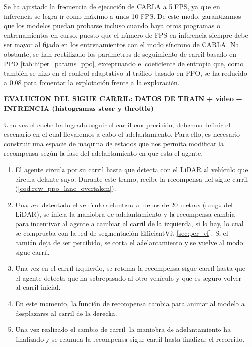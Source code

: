 Se ha ajustado la frecuencia de ejecución de CARLA a 5 \ac{FPS}, ya que en inferencia se logra ir como máximo a unos 10 \ac{FPS}. De este modo, garantizamos que los modelos puedan probarse incluso cuando haya otros programas o entrenamientos en curso, puesto que el número de \ac{FPS} en inferencia siempre debe ser mayor al fijado en los entrenamientos con el modo síncrono de CARLA. No obstante, se han reutilizado los parámetros de seguimiento de carril basado en \ac{PPO} \ref{tab:hiper_params_ppo}, exceptuando el coeficiente de entropía que, como también se hizo en el control adaptativo al tráfico basado en \ac{PPO}, se ha reducido a 0.08 para fomentar la explotación frente a la exploración.

\textbf{EVALUCION DEL SIGUE CARRIL: DATOS DE TRAIN + video + INFRENCIA (histogramas steer y throttle)}

Una vez el coche ha logrado seguir el carril con precisión, debemos definir el escenario en el cual llevaremos a cabo el adelantamiento. Para ello, es necesario construir una espacie de máquina de estados que nos permita modificar la recompensa según la fase del adelantamiento en que esta el agente.
\begin{enumerate}
\item El agente circula por su carril hasta que detecta con el \ac{LiDAR} al vehículo que circula delante suyo. Durante este tramo, recibe la recompensa del sigue-carril (\ref{cod:rew_ppo_lane_overtaken}).
\item Una vez detectado el vehículo delantero a menos de 20 metros (rango del \ac{LiDAR}), se inicia la maniobra de adelantamiento y la recompensa cambia para incentivar al agente a cambiar al carril de la izquierda, si lo hay, lo cual se comprueba con la red de segmentación EfficientVit \ref{sec:per_ef}. Si el camión deja de ser percibido, se corta el adelantamiento y se vuelve al modo sigue-carril.
\item Una vez en el carril izquierdo, se retoma la recompensa sigue-carril hasta que el agente detecta que ha sobrepasado al otro vehículo y que es seguro volver al carril inicial.
\item En este momento, la función de recompensa cambia para animar al modelo a desplazarse al carril de la derecha.
\item Una vez realizado el cambio de carril, la maniobra de adelantamiento ha finalizado y se reanuda la recompensa sigue-carril hasta finalizar el recorrido.
\end{enumerate}

